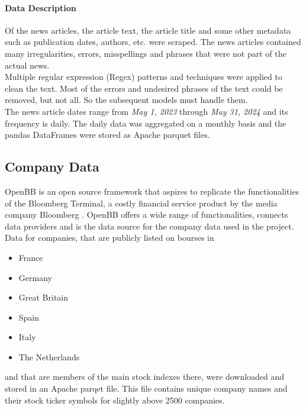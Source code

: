 \paragraph{Data Description}\label{par:data-description}
Of the news articles, the article text, the article title and some other metadata such as publication dates, authors, etc. were scraped.
The news articles contained many irregularities, errors, misspellings and phrases that were not part of the actual news.\\
Multiple regular expression (\gls{Regex}) patterns and techniques were applied to clean the text.
Most of the errors and undesired phrases of the text could be removed, but not all.
So the subsequent models must handle them.\\
The news article dates range from \emph{May 1, 2023} through \emph{May 31, 2024} and its frequency is daily.
The daily data was aggregated on a monthly basis and the pandas DataFrames were stored as Apache parquet \cite{parquet} files.

\subsection{Company Data}
OpenBB \cite{openbb} is an open source framework that aspires to replicate the functionalities of the Bloomberg Terminal, a costly financial service product by the media company Bloomberg \cite{bloomberg}.
OpenBB offers a wide range of functionalities, connects data providers and is the data source for the company data used in the project.
Data for companies, that are publicly listed on bourses in
\begin{itemize}
    \item France
    \item Germany
    \item Great Britain
    \item Spain
    \item Italy
    \item The Netherlands
\end{itemize}
and that are members of the main stock indexes there, were downloaded and stored in an Apache parqet file.
This file contains unique company names and their stock ticker symbols for slightly above 2500 companies.

